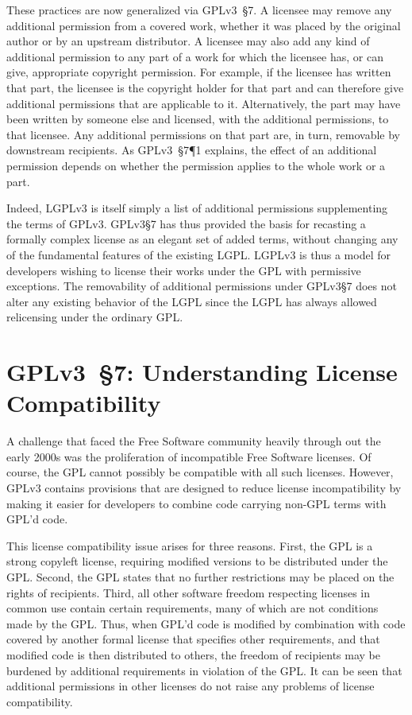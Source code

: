 These practices are now generalized via GPLv3~\S7.
A licensee may remove any additional permission from
a covered work, whether it was placed by the original author or by an
upstream distributor.  A licensee may also add any kind of additional
permission to any part of a work for which the licensee has, or can give,
appropriate copyright permission. For example, if the licensee has written
that part, the licensee is the copyright holder for that part and can
therefore give additional permissions that are applicable to it.
Alternatively, the part may have been written by someone else and licensed,
with the additional permissions, to that licensee.  Any additional
permissions on that part are, in turn, removable by downstream recipients.
As GPLv3~\S7\P1 explains, the effect of an additional permission depends on
whether the permission applies to the whole work or a part.


Indeed, LGPLv3 is itself simply  a list of additional permissions supplementing the
terms of GPLv3.  GPLv3\S7 has thus provided the basis for recasting a
formally complex license as an elegant set of added terms, without changing
any of the fundamental features of the existing LGPL\@.  LGPLv3 is thus  a model for developers wishing to license their works under the
GPL with permissive exceptions.  The removability of additional permissions
under GPLv3\S7 does not alter any existing behavior of the LGPL since the LGPL
has always allowed relicensing under the ordinary GPL\@.

\section{GPLv3~\S7: Understanding License Compatibility}
\label{license-compatibility}

A challenge that faced the Free Software community heavily through out the
early 2000s was the proliferation of incompatible Free Software licenses.  Of
course, the GPL cannot possibly be compatible with all such licenses.
However, GPLv3
contains provisions that are designed to reduce license incompatibility by
making it easier for developers to combine code carrying non-GPL terms with
GPL'd code.

This license compatibility issue arises for
three reasons.  First, the GPL is a strong copyleft license, requiring
modified versions to be distributed under the GPL\@.  Second, the GPL states
that no further restrictions may be placed on the rights of recipients.
Third, all other software freedom respecting licenses in common use contain certain
requirements, many of which are not conditions made by the GPL\@.  Thus, when
GPL'd code is modified by combination with code covered by another formal
license that specifies other requirements, and that modified code is then
distributed to others, the freedom of recipients may be burdened by
additional requirements in violation of the GPL.  It can be seen that
additional permissions in other licenses do not raise any problems of license
compatibility.


